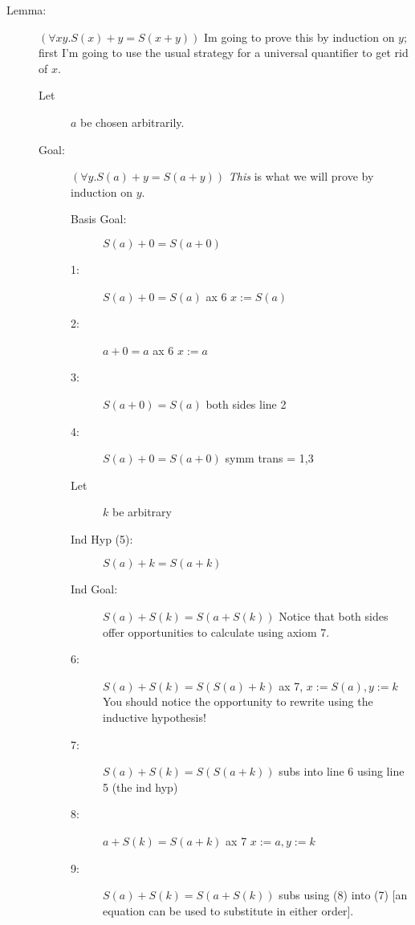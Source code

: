 \documentclass[12pt]{article}
\begin{document}
\begin{description}

\item[Lemma:]  $(\forall xy.S(x)+y=S(x+y))$  Im going to prove this by induction on $y$; first I'm going to use the usual strategy for a universal quantifier to get rid of $x$.

\begin{description}

\item[Let] $a$ be chosen arbitrarily.

\item[Goal:]  $(\forall y.S(a)+y = S(a+y))$  {\em This\/} is what we will prove by induction on $y$.

\begin{description}

\item[Basis Goal:]  $S(a)+0 =S(a+0)$

\item[1:]  $S(a)+0=S(a)$  ax 6 $x:=S(a)$

\item[2:]  $a+0=a$  ax 6 $x:=a$

\item[3:]  $S(a+0)=S(a)$  both sides line 2

\item [4:]  $S(a)+0 =S(a+0)$  symm trans = 1,3

\item[Let] $k$ be arbitrary

\item[Ind Hyp (5):]  $S(a)+k=S(a+k)$

\item[Ind Goal:]  $S(a)+S(k) = S(a+S(k))$  Notice that both sides offer opportunities to calculate using axiom 7.

\item[6:]  $S(a)+S(k) = S(S(a)+k)$  ax 7, $x:=S(a), y:=k$  You should notice the opportunity to rewrite using the inductive hypothesis!

\item[7:]  $S(a)+S(k) = S(S(a+k))$  subs into line 6 using line 5 (the ind hyp)

\item[8:]  $a+S(k)=S(a+k)$  ax 7 $x:=a,y:=k$

\item[9:]  $S(a)+S(k) = S(a+S(k))$  subs using (8) into (7)  [an equation can be used to substitute in either order].

\end{description}


\end{description}

\end{description}
\end{document}
